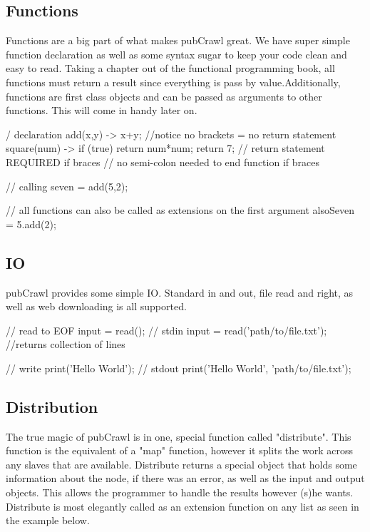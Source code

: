 \documentclass[letterpaper]{article}
\begin{document}
\subsection{Functions}
Functions are a big part of what makes pubCrawl great. We have super simple function declaration as well as some syntax sugar to keep your code clean and easy to read. Taking a chapter out of the functional programming book, all functions must return a result since everything is pass by value.Additionally, functions are first class objects and can be passed as arguments to other functions. This will come in handy later on.\\[6em]

\begin{mdframed}[hidealllines=true,backgroundcolor=gray!10,skipbelow=1em,skipabove=.5em]
\begin{code}
/ declaration
add(x,y) -> x+y; //notice no brackets = no return statement
square(num) -> {
	if (true) {
		return num*num;
	}
	return 7; // return statement REQUIRED if braces
} // no semi-colon needed to end function if braces

// calling
seven = add(5,2);

// all functions can also be called as extensions on the first argument
alsoSeven = 5.add(2);
\end{code}
\end{mdframed}
\subsection{IO}
pubCrawl provides some simple IO. Standard in and out, file read and right, as well as web downloading is all supported.

\begin{mdframed}[hidealllines=true,backgroundcolor=gray!10,skipbelow=1em,skipabove=.5em]
\begin{code}
// read to EOF
input = read(); // stdin
input = read('path/to/file.txt'); //returns collection of lines

// write
print('Hello World'); // stdout
print('Hello World', 'path/to/file.txt');
\end{code}
\end{mdframed}

\subsection{Distribution}
The true magic of pubCrawl is in one, special function called "distribute". This function is the equivalent of a "map" function, however it splits the work across any slaves that are available. Distribute returns a special object that holds some information about the node, if there was an error, as well as the input and output objects. This allows the programmer to handle the results however (s)he wants. Distribute is most elegantly called as an extension function on any list as seen in the example below.\\[6em]
\end{document}
